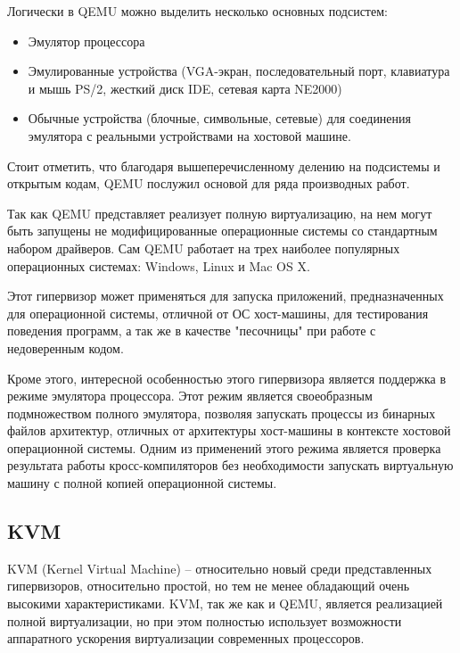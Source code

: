 Логически в QEMU можно выделить несколько основных подсистем:
\begin{itemize}
    \item Эмулятор процессора
    \item Эмулированные устройства (VGA-экран, последовательный порт, клавиатура и мышь PS/2,
     жесткий диск IDE, сетевая карта NE2000)
    \item Обычные устройства (блочные, символьные, сетевые) для соединения эмулятора с 
    реальными устройствами на хостовой машине.
\end{itemize}
Стоит отметить, что благодаря вышеперечисленному делению на подсистемы и открытым кодам,
QEMU послужил основой для ряда производных работ.
\cite{Raghav:2012:FSS:2159430.2159442} 
\cite{Becker:2012:XEQ:2380356.2380368} 
\cite{Hong:2012:HMR:2259016.2259030}
\cite{Ding:2011:PPS:2117686.2118470}
\cite{Nakamoto:2009:PUE:1524877.1525243}

Так как QEMU представляет реализует полную виртуализацию, на нем могут быть запущены
не модифицированные операционные системы со стандартным набором драйверов.
Сам QEMU работает на трех наиболее популярных операционных системах: Windows, 
Linux и Mac OS X.

Этот гипервизор может применяться для запуска приложений, предназначенных для 
операционной системы, отличной от ОС хост-машины, для тестирования поведения
программ, а так же в качестве "песочницы" при работе с недоверенным кодом.

Кроме этого, интересной особенностью этого гипервизора является поддержка в 
режиме эмулятора процессора. Этот режим является своеобразным подмножеством полного
эмулятора, позволяя запускать процессы из бинарных файлов архитектур, отличных от 
архитектуры хост-машины в контексте хостовой операционной системы. Одним из применений 
этого режима является проверка результата работы кросс-компиляторов без необходимости
запускать виртуальную машину с полной копией операционной системы.

\subsection{KVM}

KVM (Kernel Virtual Machine) -- относительно новый среди представленных гипервизоров,
относительно простой, но тем не менее обладающий очень высокими характеристиками. 
KVM, так же как и QEMU,
является реализацией полной виртуализации, но при этом полностью использует возможности 
аппаратного ускорения виртуализации современных процессоров.
\cite{Habib:2008:VK:1344209.1344217}

